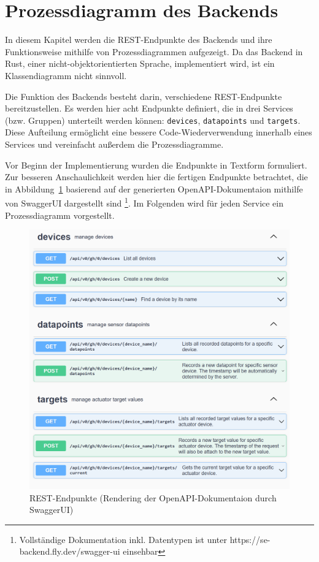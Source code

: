 \section{Prozessdiagramm des Backends}
    In diesem Kapitel werden die REST-Endpunkte des Backends und ihre Funktionsweise mithilfe von Prozessdiagrammen aufgezeigt.
    Da das Backend in Rust, einer nicht-objektorientierten Sprache, implementiert wird, ist ein Klassendiagramm nicht sinnvoll.

    Die Funktion des Backends besteht darin, verschiedene REST-Endpunkte bereitzustellen.
    Es werden hier acht Endpunkte definiert, die in drei Services (bzw. Gruppen) unterteilt werden können: \lstinline{devices}, \lstinline{datapoints} und \lstinline{targets}.
    Diese Aufteilung ermöglicht eine bessere Code-Wiederverwendung innerhalb eines Services und vereinfacht außerdem die Prozessdiagramme.

    Vor Beginn der Implementierung wurden die Endpunkte in Textform formuliert.
    Zur besseren Anschaulichkeit werden hier die fertigen Endpunkte betrachtet, die in Abbildung~\ref{fig:swagger-endpoints} basierend auf der generierten OpenAPI-Dokumentaion mithilfe von SwaggerUI dargestellt sind
    \footnote{Vollständige Dokumentation inkl. Datentypen ist unter https://se-backend.fly.dev/swagger-ui einsehbar}.
    Im Folgenden wird für jeden Service ein Prozessdiagramm vorgestellt.

    \begin{figure}[H]
        \includegraphics[width=0.95\linewidth]{images/swagger-endpoints.png}
        \centering
        \caption{REST-Endpunkte (Rendering der OpenAPI-Dokumentaion durch SwaggerUI)}
        \label{fig:swagger-endpoints}
    \end{figure}


